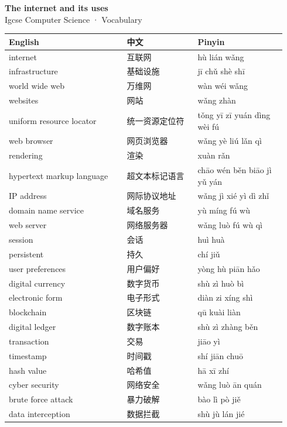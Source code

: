 \documentclass[11pt]{article}
\begin{document}
\begin{center}
  {\LARGE\bfseries The internet and its uses}\\[0.35em]
  {\large Igcse Computer Science · Vocabulary}
\end{center}
\vspace{0.6em}

\begin{longtable}{@{}p{0.40\linewidth}p{0.24\linewidth}p{0.30\linewidth}@{}}
\toprule
\textbf{English} & \textbf{中文} & \textbf{Pinyin} \\
\midrule
\endhead
\bottomrule
\endlastfoot
internet & 互联网 & hù lián wǎng \\
infrastructure & 基础设施 & jī chǔ shè shī \\
world wide web & 万维网 & wàn wéi wǎng \\
websites & 网站 & wǎng zhàn \\
uniform resource locator & 统一资源定位符 & tǒng yī zī yuán dìng wèi fú \\
web browser & 网页浏览器 & wǎng yè liú lǎn qì \\
rendering & 渲染 & xuàn rǎn \\
hypertext markup language & 超文本标记语言 & chāo wén běn biāo jì yǔ yán \\
IP address & 网际协议地址 & wǎng jì xié yì dì zhǐ \\
domain name service & 域名服务 & yù míng fú wù \\
web server & 网络服务器 & wǎng luò fú wù qì \\
session & 会话 & huì huà \\
persistent & 持久 & chí jiǔ \\
user preferences & 用户偏好 & yòng hù piān hǎo \\
digital currency & 数字货币 & shù zì huò bì \\
electronic form & 电子形式 & diàn zi xíng shì \\
blockchain & 区块链 & qū kuài liàn \\
digital ledger & 数字账本 & shù zì zhàng běn \\
transaction & 交易 & jiāo yì \\
timestamp & 时间戳 & shí jiān chuō \\
hash value & 哈希值 & hā xī zhí \\
cyber security & 网络安全 & wǎng luò ān quán \\
brute force attack & 暴力破解 & bào lì pò jiě \\
data interception & 数据拦截 & shù jù lán jié \\

\end{longtable}
\end{document}
